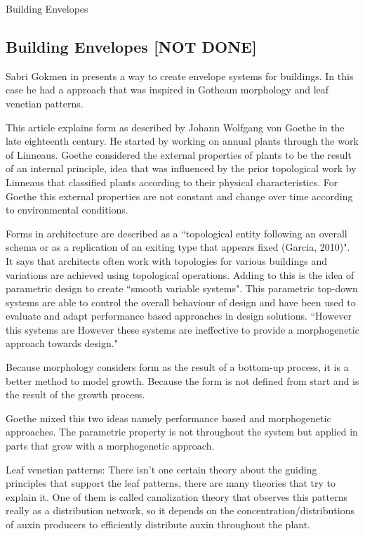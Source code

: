 
Building Envelopes
\subsection{Building Envelopes [NOT DONE]} %
\label{sub:building_envelopes}

Sabri Gokmen in \cite{Gokmen2013} presents a way to create envelope systems for buildings. In this case he had a approach that was inspired in Gotheam morphology and leaf venetian patterns.

This article explains form as described by Johann Wolfgang von Goethe in the late eighteenth century. He started by working on annual plants through the work of Linneaus. Goethe considered the external properties of plants to be the result of an internal principle, idea that was influenced by the prior topological work by Linneaus that classified plants according to their physical characteristics.
For Goethe this external properties are not constant and change over time according to environmental conditions.

Forms in architecture are described as a ``topological entity following an overall schema or as a replication of an exiting type that appears fixed (Garcia, 2010)". It says that architects often work with topologies for various buildings and variations are achieved using topological operations. Adding to this is the idea of parametric design to create ``smooth variable systems". This parametric  top-down systems are able to control the overall behaviour of design and have been used to evaluate and adapt performance based approaches in design solutions. ``However this systems are However these systems are ineffective to provide a morphogenetic approach towards design."

Because morphology considers form as the result of a bottom-up process, it is a better method to model growth. Because the form is not defined from start and is the result of the growth process.

Goethe mixed this two ideas namely performance based and morphogenetic approaches. The parametric property is not throughout the system but applied in parts that grow with a morphogenetic approach.

Leaf venetian patterns:
There isn't one certain theory about the guiding principles that support the leaf patterns, there are many theories that try to explain it. One of them is called canalization theory that observes this patterns really as a distribution network, so it depends on the concentration/distributions of auxin producers to efficiently distribute auxin throughout the plant.

